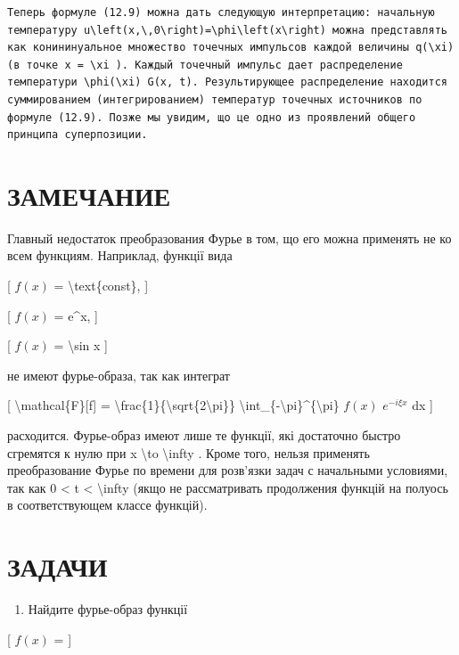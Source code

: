 \documentclass[
]{article}
\providecommand{\tightlist}{%
  \setlength{\itemsep}{0pt}\setlength{\parskip}{0pt}}
\begin{document}
{{\begin{verbatim}
Теперь формуле (12.9) можна дать следующую интерпретацию: начальную температуру u\left(x,\,0\right)=\phi\left(x\right) можна представлять как конининуальное множество точечных импульсов каждой величины q(\xi) (в точке x = \xi ). Каждый точечный импульс дает распределение температури \phi(\xi) G(x, t). Результирующее распределение находится суммированием (интегрированием) температур точечных источников по формуле (12.9). Позже мы увидим, що це одно из проявлений общего принципа суперпозиции.
\end{verbatim}

\section{ЗАМЕЧАНИЕ}\label{ux437ux430ux43cux435ux447ux430ux43dux438ux435}

Главный недостаток преобразования Фурье в том, що его можна применять не
ко всем функциям. Наприклад, функції вида

{[} \(f(x)\) = \textbackslash text\{const\}, {]}

{[} \(f(x)\) = e\^{}x, {]}

{[} \(f(x)\) = \textbackslash sin x {]}

не имеют фурье-образа, так как интеграт

{[} \textbackslash mathcal\{F\}{[}f{]} =
\textbackslash frac\{1\}\{\textbackslash sqrt\{2\textbackslash pi\}\}
\textbackslash int\_\{-\textbackslash pi\}\^{}\{\textbackslash pi\}
\(f(x)\) \(e^{-i\xi x}\) dx {]}

расходится. Фурье-образ имеют лише те функції, які достаточно быстро
сгремятся к нулю при \textbar x\textbar{} \textbackslash to
\textbackslash infty . Кроме того, нельзя применять преобразование Фурье
по времени для розв'язки задач с начальными условиями, так как 0
\textless{} t \textless{} \textbackslash infty (якщо не рассматривать
продолжения функцій на полуось в соответствующем классе функцій).

\section{ЗАДАЧИ}\label{ux437ux430ux434ux430ux447ux438-1}

\begin{enumerate}
\def\labelenumi{\arabic{enumi}.}
\tightlist
\item
  Найдите фурье-образ функції
\end{enumerate}

{[} \(f(x)\) = {]}

}}
\end{document}
